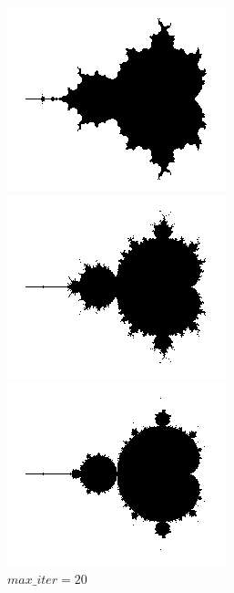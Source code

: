 \documentclass{ctexart}
\begin{document}
\begin{figure}[htbp]
	\centering
	\begin{minipage}{0.45\linewidth}
		\centering
		\includegraphics[width=0.62\linewidth]{M_iter_10.png}
		\caption{$max\_iter=10$}
		\label{chutian1}%
	\end{minipage}
	\begin{minipage}{0.45\linewidth}
		\centering
		\includegraphics[width=0.62\linewidth]{M_iter_20.png}
		\caption{$max\_iter=20$}
		\label{chutian2}%
	\end{minipage}
	\qquad
		\begin{minipage}{0.45\linewidth}
			\centering
			\includegraphics[width=0.62\linewidth]{M_iter_100.png}

\end{minipage}
\end{figure}
\end{document}
